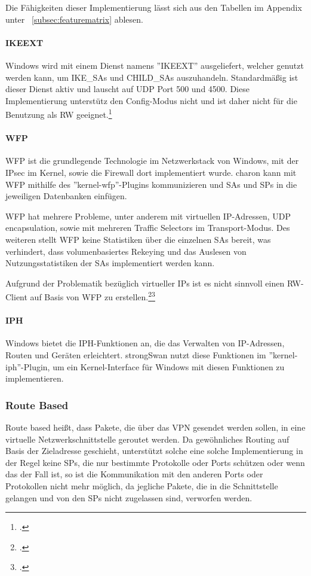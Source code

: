 Die Fähigkeiten dieser Implementierung lässt sich aus den Tabellen im Appendix unter ~\autoref{subsec:featurematrix} ablesen.


\paragraph{IKEEXT}
Windows wird mit einem Dienst namens ''IKEEXT'' ausgeliefert,
welcher genutzt werden kann, um IKE\_SAs und CHILD\_SAs auszuhandeln. Standardmäßig
ist dieser Dienst aktiv und lauscht auf \ac{UDP} Port 500 und 4500.
Diese Implementierung unterstütz den Config-Modus nicht und ist daher nicht für die Benutzung als \ac{RW} geeignet.\footcite[][]{_ipsec_2016}

\paragraph{WFP}
\ac{WFP} ist die grundlegende Technologie im Netzwerkstack von Windows, mit
der \ac{IPsec} im Kernel, sowie die Firewall dort implementiert wurde.
charon kann mit \ac{WFP} mithilfe des ''kernel-wfp''-Plugins kommunizieren
und \acp{SA} und \acp{SP} in die jeweiligen Datenbanken einfügen.

\ac{WFP} hat mehrere Probleme, unter anderem mit virtuellen IP-Adressen,
UDP encapsulation, sowie mit mehreren Traffic Selectors im Transport-Modus.
Des weiteren stellt \ac{WFP} keine Statistiken über die einzelnen \acp{SA} bereit,
was verhindert, dass volumenbasiertes Rekeying und das Auslesen von Nutzungsstatistiken
der \acp{SA} implementiert werden kann.

Aufgrund der Problematik bezüglich virtueller IPs ist es nicht sinnvoll einen \ac{RW}-Client
auf Basis von \ac{WFP} zu erstellen.\footcite[][]{tobias_brunner_kernel-wfp_2014}\footcite[][]{martin_willi_git.strongswan.org_2014}

\paragraph{IPH}
Windows bietet die \ac{IPH}-Funktionen an, die das Verwalten von
\ac{IP}-Adressen, Routen und Geräten erleichtert. strongSwan
nutzt diese Funktionen im ''kernel-iph''-Plugin, um ein Kernel-Interface
für Windows mit diesen Funktionen zu implementieren.


\subsubsection{Route Based}
\label{subsec:routebased}
Route based heißt, dass Pakete, die über das VPN
gesendet werden sollen, in eine virtuelle Netzwerkschnittstelle geroutet werden.
Da gewöhnliches Routing auf Basis der Zieladresse geschieht, unterstützt solche eine solche Implementierung
in der Regel keine \acp{SP}, die nur bestimmte Protokolle oder Ports schützen oder wenn das der Fall ist,
so ist die Kommunikation mit den anderen Ports oder Protokollen nicht mehr möglich,
da jegliche Pakete, die in die Schnittstelle gelangen und von den \acp{SP} nicht zugelassen sind, verworfen werden.

